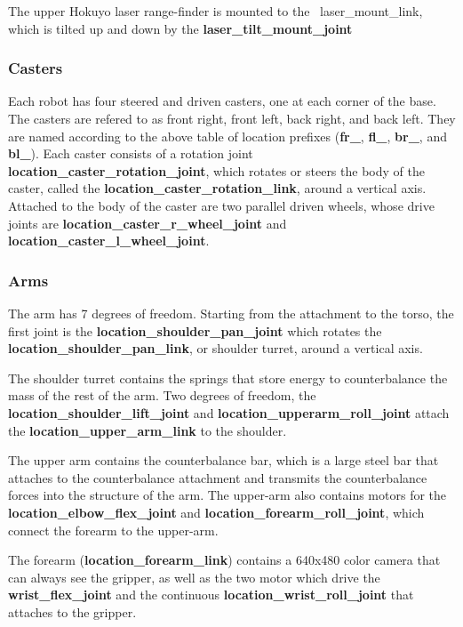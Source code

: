 The upper Hokuyo laser range-finder is mounted to the {\ laser\_mount\_link}, which is tilted up and down by the {\bf laser\_tilt\_mount\_joint}
\subsubsection{Casters}
Each robot has four steered and driven casters, one at each corner of the base.  The casters are refered to as front right, front left, back right, and back left.  They are named according to the above table of location prefixes ({\bf fr\_}, {\bf fl\_}, {\bf br\_}, and {\bf bl\_}).  Each caster consists of a rotation joint {\bf location\_caster\_rotation\_joint}, which rotates or steers the body of the caster, called the {\bf location\_caster\_rotation\_link}, around a vertical axis.  Attached to the body of the caster are two parallel driven wheels, whose drive joints are {\bf location\_caster\_r\_wheel\_joint} and {\bf location\_caster\_l\_wheel\_joint}.

\subsubsection{Arms}
The arm has 7 degrees of freedom.  Starting from the attachment to the torso, the first joint is the {\bf location\_shoulder\_pan\_joint} which rotates the {\bf location\_shoulder\_pan\_link}, or shoulder turret, around a vertical axis.

The shoulder turret contains the springs that store energy to counterbalance the mass of the rest of the arm.  Two degrees of freedom, the {\bf location\_shoulder\_lift\_joint} and {\bf location\_upperarm\_roll\_joint} attach the {\bf location\_upper\_arm\_link} to the shoulder.

The upper arm contains the counterbalance bar, which is a large steel bar that attaches to the counterbalance attachment and transmits the counterbalance forces into the structure of the arm.  The upper-arm also contains motors for the {\bf location\_elbow\_flex\_joint} and {\bf location\_forearm\_roll\_joint}, which connect the forearm to the upper-arm.

The forearm ({\bf location\_forearm\_link}) contains a 640x480 color camera that can always see the gripper, as well as the two motor which drive the {\bf wrist\_flex\_joint} and the continuous {\bf location\_wrist\_roll\_joint} that attaches to the gripper.

